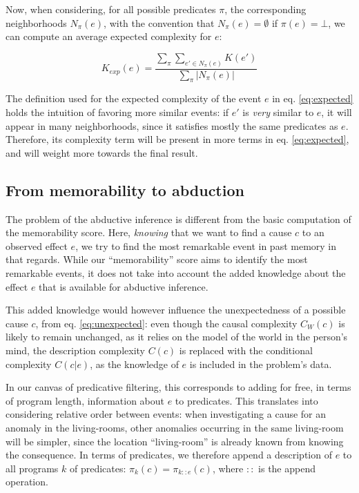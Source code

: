 \documentclass[conference]{IEEEtran}
\begin{document}
Now, when considering, for all possible predicates $\pi$, the corresponding
neighborhoods $N_{\pi}(e)$, with the convention that $N_{\pi}(e) = \emptyset$
if $\pi(e) = \bot$, we can compute an average expected complexity for $e$:

\begin{equation}
\label{eq:expected}
K_{exp}(e) = \frac{
                    \sum_{\pi} \sum_{e' \in N_{\pi}(e)} K(e')
                  }{
                    \sum_{\pi} |N_{\pi}(e)|
                  }
\end{equation}

The definition used for the expected complexity of the event $e$ in eq.
\ref{eq:expected} holds the intuition of favoring more similar events: if $e'$
is \emph{very} similar to $e$, it will appear in many neighborhoods, since it
satisfies mostly the same predicates as $e$. Therefore, its complexity term will
be present in more terms in eq. \ref{eq:expected}, and will weight more towards
the final result.

\subsection{From memorability to abduction}
The problem of the abductive inference is different from the basic computation
of the memorability score. Here, \emph{knowing} that we want to find a cause $c$
to an observed effect $e$, we try to find the most remarkable event in past
memory in that regards. While our ``memorability'' score aims to identify the
most remarkable events, it does not take into account the added knowledge about
the effect $e$ that is available for abductive inference.

This added knowledge would however influence the unexpectedness of a possible
cause $c$, from eq. \ref{eq:unexpected}: even though the causal complexity
$C_{W}(c)$ is likely to remain unchanged, as it relies on the model of the world in
the person's mind, the description complexity $C(c)$ is replaced with the
conditional complexity $C(c|e)$, as the knowledge of $e$ is included in the
problem's data.

In our canvas of predicative filtering, this corresponds to adding for free, in
terms of program length, information about $e$ to predicates. This translates
into considering relative order between events: when investigating a cause for
an anomaly in the living-rooms, other anomalies occurring in the same
living-room will be simpler, since the location ``living-room'' is already known
from knowing the consequence. In terms of predicates, we therefore append a
description of $e$ to all programs $k$ of predicates:
$\pi_{k}(c) = \pi_{k::e}(c)$, where $::$ is the append operation.
\end{document}
